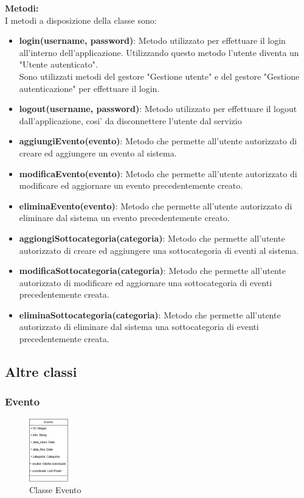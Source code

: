 \documentclass{article}
\begin{document}
\textbf{Metodi:}\\
I metodi a disposizione della classe sono:
\begin{itemize}
    \item \textbf{login(username, password)}: Metodo utilizzato per effettuare il login all'interno dell'applicazione. Utilizzando questo metodo l'utente diventa un "Utente autenticato".\\Sono utilizzati metodi del gestore "Gestione utente" e del gestore "Gestione autenticazione" per effettuare il login.
    \item \textbf{logout(username, password)}: Metodo utilizzato per effettuare il logout dall'applicazione, cosi' da disconnettere l'utente dal servizio
    \item \textbf{aggiungiEvento(evento)}: Metodo che permette all'utente autorizzato di creare ed aggiungere un evento al sistema.
    \item \textbf{modificaEvento(evento)}: Metodo che permette all'utente autorizzato di modificare ed aggiornare un evento precedentemente creato.
    \item \textbf{eliminaEvento(evento)}: Metodo che permette all'utente autorizzato di eliminare dal sistema un evento precedentemente creato.
    \item \textbf{aggiongiSottocategoria(categoria)}: Metodo che permette all'utente autorizzato di creare ed aggiungere una sottocategoria di eventi al sistema.
    \item \textbf{modificaSottocategoria(categoria)}: Metodo che permette all'utente autorizzato di modificare ed aggiornare una sottocategoria di eventi precedentemente creata.
    \item \textbf{eliminaSottocategoria(categoria)}: Metodo che permette all'utente autorizzato di eliminare dal sistema una sottocategoria di eventi precedentemente creata.
\end{itemize}

\clearpage

\subsection{Altre classi}

\subsubsection{Evento}

\begin{figure}[htbp]
    \centering
    \includegraphics[width=0.15\textwidth]{Images/evento_class.png}
    \caption{Classe Evento}
    \label{fig:evento}
\end{figure}
\end{document}
